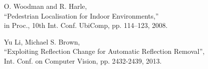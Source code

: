 \begin{thebibliography}{99}
O. Woodman and R. Harle,\\
``Pedestrian Localisation for Indoor Environments,''\\
in Proc., 10th Int. Conf. UbiComp, pp. 114–123, 2008.

Yu Li, Michael S. Brown, \\
“Exploiting Reﬂection Change for Automatic Reﬂection Removal”,\\
Int. Conf. on Computer Vision, pp. 2432-2439, 2013.

\end{thebibliography}

%